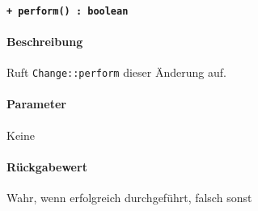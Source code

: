 \paragraph{\texttt{+ perform() : boolean}}%
\paragraph*{Beschreibung}
Ruft \verb#Change::perform# dieser Änderung auf.
\paragraph*{Parameter}
Keine
\paragraph*{Rückgabewert}
Wahr, wenn erfolgreich durchgeführt, falsch sonst